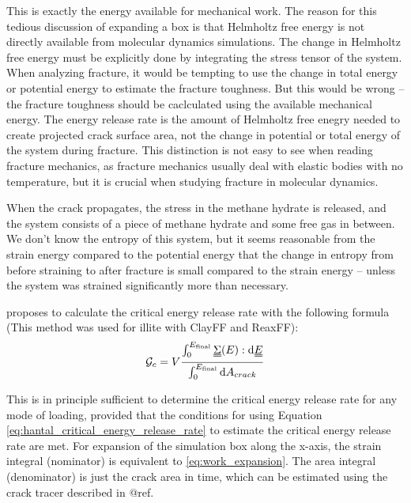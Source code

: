 This is exactly the energy available for mechanical work. The reason for this tedious discussion of expanding a box is that Helmholtz free energy is not directly available from molecular dynamics simulations. The change in Helmholtz free energy must be explicitly done by integrating the stress tensor of the system. When analyzing fracture, it would be tempting to use the change in total energy or potential energy to estimate the fracture toughness. But this would be wrong -- the fracture toughness should be caclculated using the available mechanical energy. The energy release rate is the amount of Helmholtz free enegry needed to create projected crack surface area, not the change in potential or total energy of the system during fracture. This distinction is not easy to see when reading fracture mechanics, as fracture mechanics usually deal with elastic bodies with no temperature, but it is crucial when studying fracture in molecular dynamics.

When the crack propagates, the stress in the methane hydrate is released, and the system consists of a piece of methane hydrate and some free gas in between. We don't know the entropy of this system, but it seems reasonable from the strain energy compared to the potential energy that the change in entropy from before straining to after fracture is small compared to the strain energy -- unless the system was strained significantly more than necessary.


\citet{Hantal2014} proposes to calculate the critical energy release rate with the following formula (This method was used for illite with ClayFF and ReaxFF):
\begin{equation}
	\mathcal{G}_c = V \frac{\int_0^{E_{\text{final}}}\uuline{\Sigma}(E) : \dd \uuline{E}}{\int_0^{E_{\text{final}}} \dd A_{crack}}
	\label{eq:hantal_critical_energy_release_rate}
\end{equation}


This is in principle sufficient to determine the critical energy release rate for any mode of loading, provided that the conditions for using Equation \ref{eq:hantal_critical_energy_release_rate} to estimate the critical energy release rate are met. 
For expansion of the simulation box along the x-axis, the strain integral (nominator) is equivalent to \ref{eq:work_expansion}. The area integral (denominator) is just the crack area in time, which can be estimated using the crack tracer described in @ref. 

